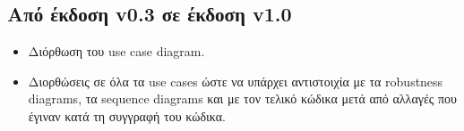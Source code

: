 \documentclass[12pt,a4paper]{article}
\begin{document}
\subsection{Από έκδοση v0.3 σε έκδοση v1.0}
\begin{itemize}
    \item Διόρθωση του use case diagram.
    \item Διορθώσεις σε όλα τα use cases ώστε να υπάρχει αντιστοιχία με τα robustness diagrams, τα sequence diagrams και με τον τελικό κώδικα μετά από αλλαγές που έγιναν κατά τη συγγραφή του κώδικα.
\end{itemize}
\end{document}
